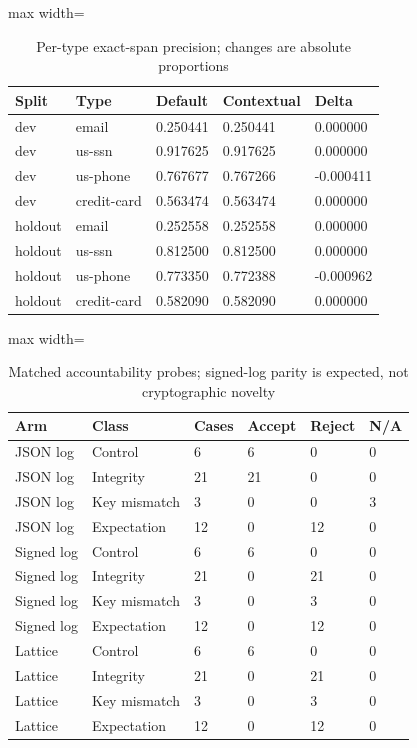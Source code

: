 \begin{table}[t]
\centering
\caption{Per-type exact-span precision; changes are absolute proportions}
\label{tab:validated-pii-precision}
\begingroup\small\setlength{\tabcolsep}{3pt}
\begin{adjustbox}{max width=\linewidth}
\begin{tabular}{lllll}
\hline
Split & Type & Default & Contextual & Delta \\
\hline
dev & email & 0.250441 & 0.250441 & 0.000000 \\
dev & us-ssn & 0.917625 & 0.917625 & 0.000000 \\
dev & us-phone & 0.767677 & 0.767266 & -0.000411 \\
dev & credit-card & 0.563474 & 0.563474 & 0.000000 \\
holdout & email & 0.252558 & 0.252558 & 0.000000 \\
holdout & us-ssn & 0.812500 & 0.812500 & 0.000000 \\
holdout & us-phone & 0.773350 & 0.772388 & -0.000962 \\
holdout & credit-card & 0.582090 & 0.582090 & 0.000000 \\
\hline
\end{tabular}
\end{adjustbox}\endgroup
\end{table}

\begin{table}[t]
\centering
\caption{Matched accountability probes; signed-log parity is expected, not cryptographic novelty}
\label{tab:validated-accountability}
\begingroup\small\setlength{\tabcolsep}{3pt}
\begin{adjustbox}{max width=\linewidth}
\begin{tabular}{llllll}
\hline
Arm & Class & Cases & Accept & Reject & N/A \\
\hline
JSON log & Control & 6 & 6 & 0 & 0 \\
JSON log & Integrity & 21 & 21 & 0 & 0 \\
JSON log & Key mismatch & 3 & 0 & 0 & 3 \\
JSON log & Expectation & 12 & 0 & 12 & 0 \\
Signed log & Control & 6 & 6 & 0 & 0 \\
Signed log & Integrity & 21 & 0 & 21 & 0 \\
Signed log & Key mismatch & 3 & 0 & 3 & 0 \\
Signed log & Expectation & 12 & 0 & 12 & 0 \\
Lattice & Control & 6 & 6 & 0 & 0 \\
Lattice & Integrity & 21 & 0 & 21 & 0 \\
Lattice & Key mismatch & 3 & 0 & 3 & 0 \\
Lattice & Expectation & 12 & 0 & 12 & 0 \\
\hline
\end{tabular}
\end{adjustbox}\endgroup
\end{table}

